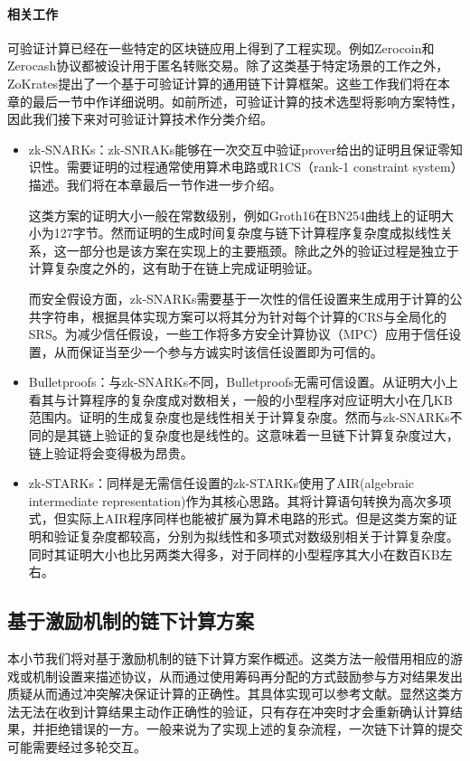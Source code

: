 \paragraph{相关工作}
可验证计算已经在一些特定的区块链应用上得到了工程实现。例如Zerocoin\cite{6547123}和Zerocash\cite{6956581}协议都被设计用于匿名转账交易。除了这类基于特定场景的工作之外，ZoKrates\cite{8726497}提出了一个基于可验证计算的通用链下计算框架。这些工作我们将在本章的最后一节中作详细说明。如前所述，可验证计算的技术选型将影响方案特性，因此我们接下来对可验证计算技术作分类介绍。
\begin{itemize}
    \setlength{\itemsep}{0pt}
    \setlength{\parsep}{0pt}
    \setlength{\parskip}{0pt}
    \item zk-SNARKs：zk-SNRAKs能够在一次交互中验证prover给出的证明且保证零知识性。需要证明的过程通常使用算术电路\cite{10.1145/2856449}或R1CS\cite{184425}（rank-1 constraint system）描述。我们将在本章最后一节作进一步介绍。
    
    这类方案的证明大小一般在常数级别，例如Groth16\cite{cryptoeprint:2016/260}在BN254曲线上的证明大小为127字节\cite{cryptoeprint:2005/133}。然而证明的生成时间复杂度与链下计算程序复杂度成拟线性关系，这一部分也是该方案在实现上的主要瓶颈。除此之外的验证过程是独立于计算复杂度之外的，这有助于在链上完成证明验证。

    而安全假设方面，zk-SNARKs需要基于一次性的信任设置来生成用于计算的公共字符串，根据具体实现方案可以将其分为针对每个计算的CRS与全局化的SRS。为减少信任假设，一些工作\cite{cryptoeprint:2017/1050, 7163032}将多方安全计算协议（MPC）应用于信任设置，从而保证当至少一个参与方诚实时该信任设置即为可信的。
    \item Bulletproofs：与zk-SNARKs不同，Bulletproofs\cite{8418611}无需可信设置。从证明大小上看其与计算程序的复杂度成对数相关，一般的小型程序对应证明大小在几KB范围内。证明的生成复杂度也是线性相关于计算复杂度。然而与zk-SNARKs不同的是其链上验证的复杂度也是线性的。这意味着一旦链下计算复杂度过大，链上验证将会变得极为昂贵。
    \item zk-STARKs：同样是无需信任设置的zk-STARKs\cite{cryptoeprint:2018/046}使用了AIR(algebraic intermediate representation)作为其核心思路。其将计算语句转换为高次多项式，但实际上AIR程序同样也能被扩展为算术电路的形式。但是这类方案的证明和验证复杂度都较高，分别为拟线性和多项式对数级别相关于计算复杂度。同时其证明大小也比另两类大得多，对于同样的小型程序其大小在数百KB左右。
\end{itemize}

\subsection{基于激励机制的链下计算方案}
本小节我们将对基于激励机制的链下计算方案作概述。这类方法一般借用相应的游戏或机制设置来描述协议，从而通过使用筹码再分配的方式鼓励参与方对结果发出质疑从而通过冲突解决保证计算的正确性。其具体实现可以参考文献\cite{hurwicz_reiter_2006}。显然这类方法无法在收到计算结果主动作正确性的验证，只有存在冲突时才会重新确认计算结果，并拒绝错误的一方。一般来说为了实现上述的复杂流程，一次链下计算的提交可能需要经过多轮交互。

